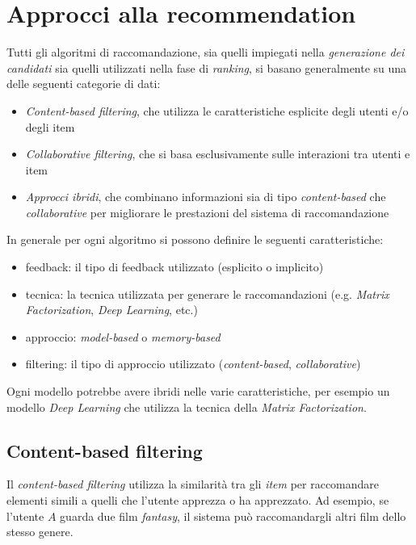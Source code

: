 \section{Approcci alla recommendation}

Tutti gli algoritmi di raccomandazione, sia quelli impiegati nella \textit{generazione dei candidati} sia quelli utilizzati nella fase di \textit{ranking}, si basano generalmente su una delle seguenti categorie di dati:

\begin{itemize}
    \item \textit{Content-based filtering}, che utilizza le caratteristiche esplicite degli utenti e/o degli item
    \item \textit{Collaborative filtering}, che si basa esclusivamente sulle interazioni tra utenti e item
    \item \textit{Approcci ibridi}, che combinano informazioni sia di tipo \textit{content-based} che \textit{collaborative} per migliorare le prestazioni del sistema di raccomandazione
\end{itemize}

In generale per ogni algoritmo si possono definire le seguenti caratteristiche:

\begin{itemize}
    \item feedback: il tipo di feedback utilizzato (esplicito o implicito)
    \item tecnica: la tecnica utilizzata per generare le raccomandazioni (e.g. \textit{Matrix Factorization}, \textit{Deep Learning}, etc.)
    \item approccio: \textit{model-based} o \textit{memory-based}
    \item filtering: il tipo di approccio utilizzato (\textit{content-based}, \textit{collaborative})
\end{itemize}

Ogni modello potrebbe avere ibridi nelle varie caratteristiche, per esempio un modello \textit{Deep Learning} che utilizza la tecnica della \textit{Matrix Factorization}.


\subsection{Content-based filtering}
Il \textit{content-based filtering} utilizza la similarità tra gli \textit{item} per raccomandare elementi simili a quelli che l'utente apprezza o ha apprezzato. Ad esempio, se l'utente $A$ guarda due film \textit{fantasy}, il sistema può raccomandargli altri film dello stesso genere.

